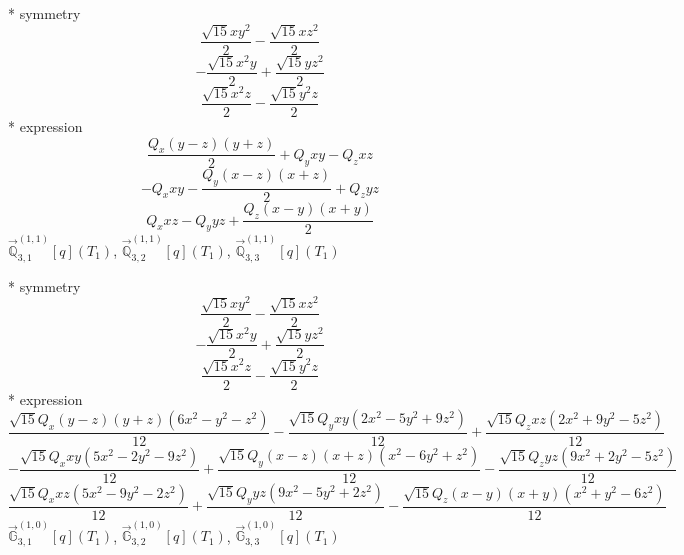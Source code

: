 \documentclass[fleqn,8pt]{jsarticle}
\begin{document}
\noindent\quad ** symmetry
\begin{dmath*}
\frac{\sqrt{15} x y^{2}}{2} - \frac{\sqrt{15} x z^{2}}{2}
\end{dmath*}
\begin{dmath*}
- \frac{\sqrt{15} x^{2} y}{2} + \frac{\sqrt{15} y z^{2}}{2}
\end{dmath*}
\begin{dmath*}
\frac{\sqrt{15} x^{2} z}{2} - \frac{\sqrt{15} y^{2} z}{2}
\end{dmath*}
\noindent\quad ** expression
\begin{dmath*}
\frac{Q_{x} \left(y - z\right) \left(y + z\right)}{2} + Q_{y} x y - Q_{z} x z
\end{dmath*}
\begin{dmath*}
- Q_{x} x y - \frac{Q_{y} \left(x - z\right) \left(x + z\right)}{2} + Q_{z} y z
\end{dmath*}
\begin{dmath*}
Q_{x} x z - Q_{y} y z + \frac{Q_{z} \left(x - y\right) \left(x + y\right)}{2}
\end{dmath*}
\noindent\quad $\vec{\mathbb{Q}}_{3,1}^{(1,1)}[q](T_{1})$, $\vec{\mathbb{Q}}_{3,2}^{(1,1)}[q](T_{1})$, $\vec{\mathbb{Q}}_{3,3}^{(1,1)}[q](T_{1})$

\noindent\quad ** symmetry
\begin{dmath*}
\frac{\sqrt{15} x y^{2}}{2} - \frac{\sqrt{15} x z^{2}}{2}
\end{dmath*}
\begin{dmath*}
- \frac{\sqrt{15} x^{2} y}{2} + \frac{\sqrt{15} y z^{2}}{2}
\end{dmath*}
\begin{dmath*}
\frac{\sqrt{15} x^{2} z}{2} - \frac{\sqrt{15} y^{2} z}{2}
\end{dmath*}
\noindent\quad ** expression
\begin{dmath*}
\frac{\sqrt{15} Q_{x} \left(y - z\right) \left(y + z\right) \left(6 x^{2} - y^{2} - z^{2}\right)}{12} - \frac{\sqrt{15} Q_{y} x y \left(2 x^{2} - 5 y^{2} + 9 z^{2}\right)}{12} + \frac{\sqrt{15} Q_{z} x z \left(2 x^{2} + 9 y^{2} - 5 z^{2}\right)}{12}
\end{dmath*}
\begin{dmath*}
- \frac{\sqrt{15} Q_{x} x y \left(5 x^{2} - 2 y^{2} - 9 z^{2}\right)}{12} + \frac{\sqrt{15} Q_{y} \left(x - z\right) \left(x + z\right) \left(x^{2} - 6 y^{2} + z^{2}\right)}{12} - \frac{\sqrt{15} Q_{z} y z \left(9 x^{2} + 2 y^{2} - 5 z^{2}\right)}{12}
\end{dmath*}
\begin{dmath*}
\frac{\sqrt{15} Q_{x} x z \left(5 x^{2} - 9 y^{2} - 2 z^{2}\right)}{12} + \frac{\sqrt{15} Q_{y} y z \left(9 x^{2} - 5 y^{2} + 2 z^{2}\right)}{12} - \frac{\sqrt{15} Q_{z} \left(x - y\right) \left(x + y\right) \left(x^{2} + y^{2} - 6 z^{2}\right)}{12}
\end{dmath*}
\noindent\quad $\vec{\mathbb{G}}_{3,1}^{(1,0)}[q](T_{1})$, $\vec{\mathbb{G}}_{3,2}^{(1,0)}[q](T_{1})$, $\vec{\mathbb{G}}_{3,3}^{(1,0)}[q](T_{1})$
\end{document}
